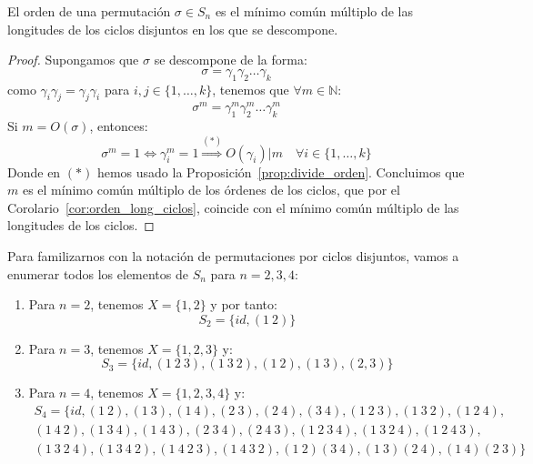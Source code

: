 \begin{coro}\label{cor:orden_permutacion}
    El orden de una permutación $\sigma\in S_n$ es el mínimo común múltiplo de las longitudes de los ciclos disjuntos en los que se descompone.
    \begin{proof}
        Supongamos que $\sigma$ se descompone de la forma:
        \begin{equation*}
            \sigma = \gamma_1\gamma_2\ldots \gamma_k
        \end{equation*}
        como $\gamma_i \gamma_j = \gamma_j \gamma_i$ para $i,j\in \{1,\ldots,k\}$, tenemos que $\forall m\in \mathbb{N}$:
        \begin{equation*}
            \sigma^m = \gamma_1^m \gamma_2^m \ldots \gamma_k^m
        \end{equation*}
        Si $m = O(\sigma)$, entonces:
        \begin{equation*}
            \sigma^m = 1 \Longleftrightarrow \gamma_i^m = 1 \stackrel{(\ast)}{\Longrightarrow} O(\gamma_i) | m \quad \forall i \in \{1,\ldots,k\}
        \end{equation*}
        Donde en $(\ast)$ hemos usado la Proposición~\ref{prop:divide_orden}. Concluimos que $m$ es el mínimo común múltiplo de los órdenes de los ciclos, que por el Corolario~\ref{cor:orden_long_ciclos}, coincide con el mínimo común múltiplo de las longitudes de los ciclos.
    \end{proof}
\end{coro}

\begin{ejemplo}
    Para familizarnos con la notación de permutaciones por ciclos disjuntos, vamos a enumerar todos los elementos de $S_n$ para $n=2,3,4$:
    \begin{enumerate}
        \item Para $n=2$, tenemos $X=\{1,2\}$ y por tanto:
            \begin{equation*}
                S_2 = \{id, (1\ 2)\}
            \end{equation*}
        \item Para $n=3$, tenemos $X=\{1,2,3\}$ y:
            \begin{equation*}
                S_3 = \{id, (1\ 2\ 3), (1\ 3\ 2), (1\ 2), (1\ 3), (2, 3)\}
            \end{equation*}
        \item Para $n=4$, tenemos $X=\{1,2,3,4\}$ y:
            \begin{multline*}
                S_4 = \{id, (1\ 2), (1\ 3), (1\ 4), (2\ 3), (2\ 4), (3\ 4), (1\ 2\ 3), (1\ 3\ 2), (1\ 2\ 4), \\
                    (1\ 4\ 2), (1\ 3\ 4), (1\ 4\ 3), (2\ 3\ 4), (2\ 4\ 3), (1\ 2\ 3\ 4), (1\ 3\ 2\ 4), (1\ 2\ 4\ 3), \\
                (1\ 3\ 2\ 4), (1\ 3\ 4\ 2), (1\ 4\ 2\ 3), (1\ 4\ 3\ 2), (1\ 2)(3\ 4), (1\ 3)(2\ 4), (1\ 4)(2\ 3)\}
            \end{multline*}
    \end{enumerate}
\end{ejemplo}

